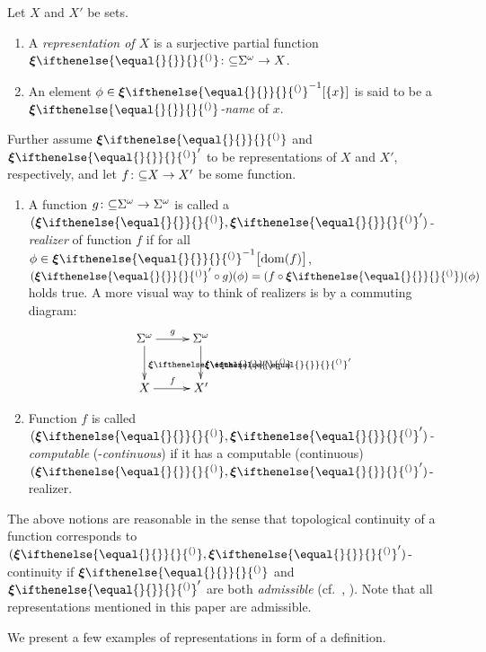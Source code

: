 \documentclass{CSML}
\newcommand{\representation}[2]{ #1\ifnotempty{#2}{^{(#2)}} }
\newcommand{\parcol}{\colon\mathnormal\subseteq}
\newcommand{\dom}{\mathrm{dom}} %
\newcommand{\Cantor}{\Sigma^\omega}
\newcommand{\reptpl}[1][\empty]{ \representation{\bm{\xi}}{#1} }
\newcommand{\ifnotempty}[2]{ \ifthenelse{ \equal{#1}{\empty} }{}{#2} }
\newcommand{\secref}[1]{\S{#1}}
\newcommand{\emdash}{\leavevmode\unskip\kern.2ex---\kern.2ex\ignorespaces}
\begin{document}
\begin{defi} \label{def:t2m-realizer}
	Let $X$ and $X'$ be sets.
	\begin{enumerate}
	\item A \emph{representation of $X$} is a surjective partial function
		$\reptpl \parcol \Cantor \to X$.
	\item An element $\phi \in \reptpl^{-1}[\{x\}]$ is said to be a
		\emph{$\reptpl$-name} of $x$.
	\end{enumerate}
	Further assume $\reptpl$ and $\reptpl'$ to be representations of $X$ and
	$X'$, respectively, and let $f \parcol X \to X'$ be some function.
	\begin{enumerate}[resume]
		\item A function $g \parcol \Cantor \to \Cantor$ is called a
			\emph{$(\reptpl,\reptpl')$-realizer} of function $f$ if for all
			$\phi \in \reptpl^{-1}\big[ \dom(f) \big]$,
			$(\reptpl' \circ g)(\phi) = (f \circ \reptpl)(\phi)$ holds true.
			A more visual way to think of realizers is by a commuting diagram:
			\begin{equation*}
				\xymatrix@R+.2em@C+.2em{
					\Cantor \ar[r]^g \ar[d]^{ \reptpl } &
					\Cantor \ar[d]^{ \reptpl' } \\
					X \ar[r]^f &
					X'
				}
			\end{equation*}
		\item Function $f$ is called \emph{$(\reptpl,\reptpl')$-computable}
			(-\emph{continuous}) if it has a computable (continuous)
			$(\reptpl,\reptpl')$-realizer.
	\end{enumerate}
\end{defi}

The above notions %
are reasonable in the
sense that topological continuity of a function corresponds to
$(\reptpl,\reptpl')$-continuity if $\reptpl$ and $\reptpl'$ are both
\emph{admissible} (cf.~\cite[\secref{3.2}]{Weih00}, \cite{Schroeder02}).
Note that all representations mentioned in this paper are admissible.

We present a few examples of representations in form of a definition.
\end{document}
